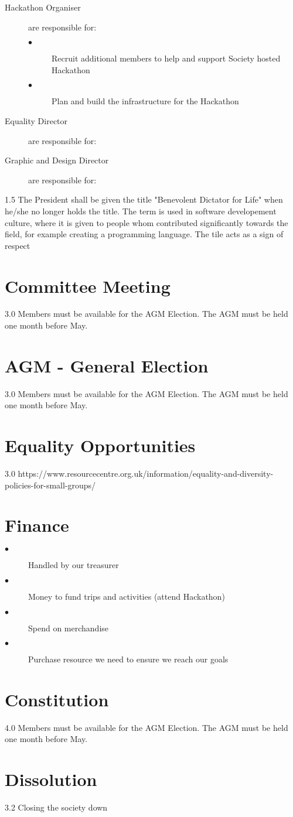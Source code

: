 \documentclass[10pt, a4paper, onecolumn]{report}
\begin{document}
\begin{description}
    \item[Hackathon Organiser] are responsible for: 
      \begin{description}
        \item[$\bullet$] Recruit additional members to help and support Society hosted
        Hackathon
        \item[$\bullet$] Plan and build the infrastructure for the Hackathon
      \end{description}

    \item[Equality Director] are responsible for: 
    \item[Graphic and Design Director] are responsible for:
    \item[]

  \end{description}

  1.5 The President shall be given the title "Benevolent Dictator for Life" when he/she no
  longer holds the title. 
  The term is used in software developement culture, where it is given to people 
  whom contributed significantly towards the field, for example creating a
  programming language. The tile acts as a sign of respect 
  
  \section{Committee Meeting}
  3.0 Members must be available for the AGM Election. The AGM must be held one month before May.
  
  \section{AGM - General Election}
  3.0 Members must be available for the AGM Election. The AGM must be held one month before May.
  
  
  \section{Equality Opportunities}
  3.0 https://www.resourcecentre.org.uk/information/equality-and-diversity-policies-for-small-groups/
  
  \section{Finance}
  \begin{description}
    \item[$\bullet$] Handled by our treasurer
    \item[$\bullet$] Money to fund trips and activities (attend Hackathon)
    \item[$\bullet$] Spend on merchandise
    \item[$\bullet$] Purchase resource we need to ensure we reach our goals
  \end{description}
  
  \section{Constitution}
  4.0 Members must be available for the AGM Election. The AGM must be held one month before May.
  
  
  \section{Dissolution}
  3.2 Closing the society down
  
  
\end{document}
